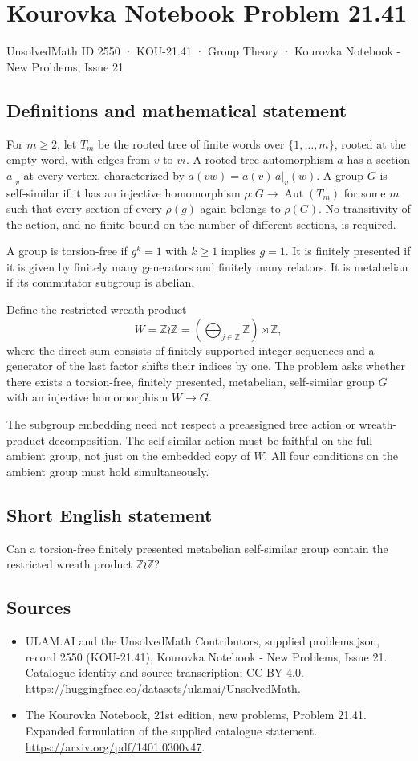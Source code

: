 \documentclass[11pt,a4paper]{article}
\begin{document}
\section*{Kourovka Notebook Problem 21.41}\label{2550}
{\small UnsolvedMath ID 2550 · KOU-21.41 · Group Theory · Kourovka Notebook - New Problems, Issue 21}
\subsection{Definitions and mathematical statement}
For $m\ge2$, let $T_m$ be the rooted tree of finite words over
$\{1,\ldots,m\}$, rooted at the empty word, with edges from $v$ to
$vi$. A rooted tree automorphism $a$ has a section $a|_v$ at every
vertex, characterized by $a(vw)=a(v)\,a|_v(w)$.
A group $G$ is self-similar if it has an injective homomorphism
$\rho:G\to\operatorname{Aut}(T_m)$ for some $m$ such that every section
of every $\rho(g)$ again belongs to $\rho(G)$. No transitivity of the
action, and no finite bound on the number of different sections, is
required.

A group is torsion-free if $g^k=1$ with $k\ge1$ implies $g=1$.
It is finitely presented if it is given by finitely many generators
and finitely many relators. It is metabelian if its commutator subgroup
is abelian.

Define the restricted wreath product
\[
 W=\mathbb Z\wr\mathbb Z
     =\left(\bigoplus_{j\in\mathbb Z}\mathbb Z\right)\rtimes\mathbb Z,
\]
where the direct sum consists of finitely supported integer sequences
and a generator of the last factor shifts their indices by one.
The problem asks whether there exists a torsion-free, finitely presented,
metabelian, self-similar group $G$ with an injective homomorphism $W\to G$.

The subgroup embedding need not respect a preassigned tree action or
wreath-product decomposition. The self-similar action must be faithful
on the full ambient group, not just on the embedded copy of $W$.
All four conditions on the ambient group must hold simultaneously.
\subsection{Short English statement}
Can a torsion-free finitely presented metabelian self-similar group contain the restricted wreath product $\mathbb Z\wr\mathbb Z$?
\subsection{Sources}
\begin{itemize}
\item[S1] ULAM.AI and the UnsolvedMath Contributors, supplied problems.json, record 2550 (KOU-21.41), Kourovka Notebook - New Problems, Issue 21. Catalogue identity and source transcription; CC BY 4.0.
\url{https://huggingface.co/datasets/ulamai/UnsolvedMath}.
\item[S2] The Kourovka Notebook, 21st edition, new problems, Problem 21.41. Expanded formulation of the supplied catalogue statement.
\url{https://arxiv.org/pdf/1401.0300v47}.
\end{itemize}
\end{document}
